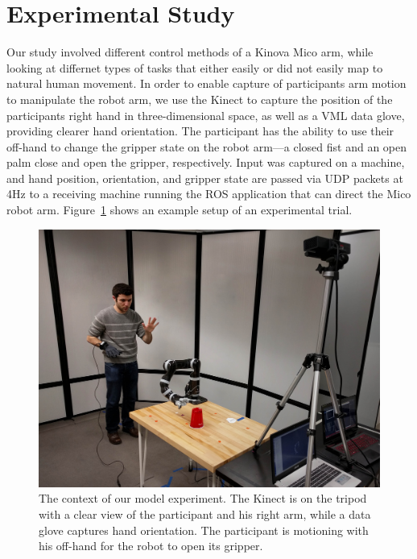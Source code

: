 \documentclass{sigchi}
\begin{document}
\section{Experimental Study}

Our study involved different control methods of a Kinova Mico arm, while looking at differnet types of tasks that either easily or did not easily map to natural human movement.  In order to enable capture of participants arm motion to manipulate the robot arm, we use the Kinect to capture the position of the participants right hand in three-dimensional space, as well as a VML data glove, providing clearer hand orientation.  The participant has the ability to use their off-hand to change the gripper state on the robot arm---a closed fist and an open palm close and open the gripper, respectively.  Input was captured on a machine, and hand position, orientation, and gripper state are passed via UDP packets at 4Hz to a receiving machine running the ROS application that can direct the Mico robot arm. Figure~\ref{fig:demo} shows an example setup of an experimental trial. 

\begin{figure}[h]
	\centering
	\includegraphics[width=0.9\columnwidth]{../Data/Figures/kinesiological_demo_2.jpg}
	\caption{The context of our model experiment.  The Kinect is on the tripod with a clear view of the participant and his right arm, while a data glove captures hand orientation.  The participant is motioning with his off-hand for the robot to open its gripper. \label{fig:demo}}
\end{figure} 
\end{document}
